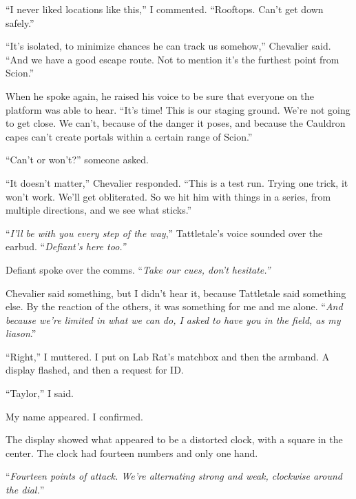 ``I never liked locations like this,'' I commented.  ``Rooftops.  Can't get down safely.''



``It's isolated, to minimize chances he can track us somehow,'' Chevalier said.  ``And we have a good escape route.  Not to mention it's the furthest point from Scion.''



When he spoke again, he raised his voice to be sure that everyone on the platform was able to hear.  ``It's time!  This is our staging ground.  We're not going to get close.  We can't, because of the danger it poses, and because the Cauldron capes can't create portals within a certain range of Scion.''



``Can't or won't?'' someone asked.



``It doesn't matter,'' Chevalier responded.  ``This is a test run.  Trying one trick, it won't work.  We'll get obliterated.  So we hit him with things in a series, from multiple directions, and we see what sticks.''



``\emph{I'll be with you every step of the way},'' Tattletale's voice sounded over the earbud.  ``\emph{Defiant's here too.''}



Defiant spoke over the comms.  ``\emph{Take our cues, don't hesitate.''}



Chevalier said something, but I didn't hear it, because Tattletale said something else.  By the reaction of the others, it was something for me and me alone.  ``\emph{And because we're limited in what we can do, I asked to have you in the field, as my liason}.''



``Right,'' I muttered.  I put on Lab Rat's matchbox and then the armband.  A display flashed, and then a request for ID.



``Taylor,'' I said.



My name appeared.  I confirmed.



The display showed what appeared to be a distorted clock, with a square in the center.  The clock had fourteen numbers and only one hand.



``\emph{Fourteen points of attack.  We're alternating strong and weak, clockwise around the dial.}''



